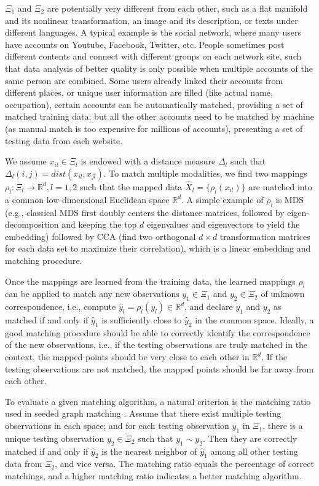 \documentclass[times,twocolumn,final]{elsarticle}
\begin{document}
$\Xi_{1}$ and $\Xi_{2}$ are potentially very different from each other, such as a flat manifold and its nonlinear transformation, an image and its description, or texts under different languages. A typical example is the social network, where many users have accounts on Youtube, Facebook, Twitter, etc. People sometimes post different contents and connect with different groups on each network site, such that data analysis of better quality is only possible when multiple accounts of the same person are combined. Some users already linked their accounts from different places, or unique user information are filled (like actual name, occupation), certain accounts can be automatically matched, providing a set of matched training data; but all the other accounts need to be matched by machine (as manual match is too expensive for millions of accounts), presenting a set of testing data from each website.

We assume $x_{il} \in \Xi_{l}$ is endowed with a distance measure $\Delta_{l}$ such that $\Delta_{l}(i,j)=dist(x_{il},x_{jl})$. To match multiple modalities, we find two mappings $\rho_{l}: \Xi_{l} \rightarrow \mathbb{R}^{d}, l=1,2$ such that the mapped data $\hat{X}_{l}=\{ \rho_{l}(x_{il}) \}$ are matched into a common low-dimensional Euclidean space $\mathbb{R}^{d}$. A simple example of $\rho_{l}$ is MDS (e.g., classical MDS first doubly centers the distance matrices, followed by eigen-decomposition and keeping the top $d$ eigenvalues and eigenvectors to yield the embedding) followed by CCA (find two orthogonal $d \times d$ transformation matrices for each data set to maximize their correlation), which is a linear embedding and matching procedure.

Once the mappings are learned from the training data, the learned mappings $\rho_{l}$ can be applied to match any new observations $y_{1} \in \Xi_{1}$ and $y_{2} \in \Xi_{2}$ of unknown correspondence, i.e., compute $\hat{y}_{l} = \rho_{l}(y_{l}) \in \mathbb{R}^{d}$, and declare $y_{1}$ and $y_{2}$ as matched if and only if $\hat{y}_{1}$ is sufficiently close to $\hat{y}_{2}$ in the common space. Ideally, a good matching procedure should be able to correctly identify the correspondence of the new observations, i.e., if the testing observations are truly matched in the context, the mapped points should be very close to each other in $\mathbb{R}^{d}$. If the testing observations are not matched, the mapped points should be far away from each other.

To evaluate a given matching algorithm, a natural criterion is the matching ratio used in seeded graph matching \citep{LyzinskiFishkindPriebe2014}. Assume that there exist multiple testing observations in each space; and for each testing observation $y_{1}$ in $\Xi_{1}$, there is a unique testing observation $y_{2} \in \Xi_{2}$ such that $y_{1} \sim y_{2}$. Then they are correctly matched if and only if $\hat{y}_{2}$ is the nearest neighbor of $\hat{y}_{1}$ among all other testing data from $\Xi_{2}$, and vice versa. The matching ratio equals the percentage of correct matchings, and a higher matching ratio indicates a better matching algorithm. 
\end{document}
